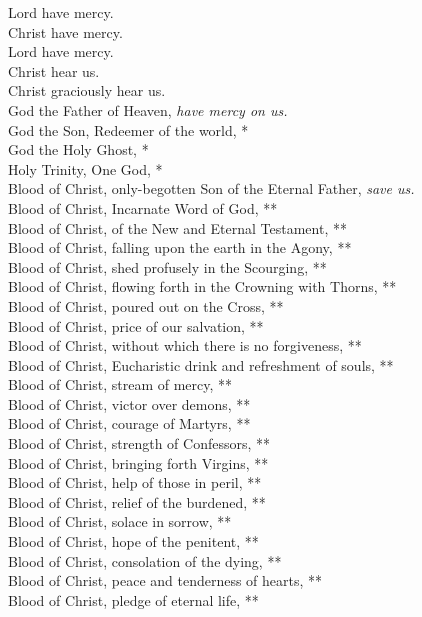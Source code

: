 \documentclass{article}
\begin{document}
\begin{multicols}{3}
\begin{FlushLeft}
Lord have mercy.\\
Christ have mercy.\\
Lord have mercy.\\
Christ hear us.\\
Christ graciously hear us.\\
God the Father of Heaven, \textit{have mercy on us.}\\
God the Son, Redeemer of the world, *\\
God the Holy Ghost, *\\
Holy Trinity, One God, *\\
Blood of Christ, only-begotten Son of the Eternal Father, \textit{save us.}\\
Blood of Christ, Incarnate Word of God, **\\
Blood of Christ, of the New and Eternal Testament, **\\
Blood of Christ, falling upon the earth in the Agony, **\\
Blood of Christ, shed profusely in the Scourging, **\\
Blood of Christ, flowing forth in the Crowning with Thorns, **\\
Blood of Christ, poured out on the Cross, **\\
Blood of Christ, price of our salvation, **\\
Blood of Christ, without which there is no forgiveness, **\\
Blood of Christ, Eucharistic drink and refreshment of souls, **\\
Blood of Christ, stream of mercy, **\\
Blood of Christ, victor over demons, **\\
Blood of Christ, courage of Martyrs, **\\
Blood of Christ, strength of Confessors, **\\
Blood of Christ, bringing forth Virgins, **\\
Blood of Christ, help of those in peril, **\\
Blood of Christ, relief of the burdened, **\\
Blood of Christ, solace in sorrow, **\\
Blood of Christ, hope of the penitent, **\\
Blood of Christ, consolation of the dying, **\\
Blood of Christ, peace and tenderness of hearts, **\\
Blood of Christ, pledge of eternal life, **\\

\end{FlushLeft}
\end{multicols}
\end{document}
